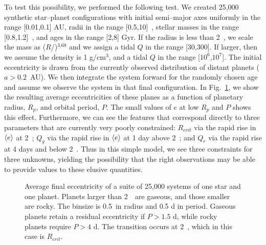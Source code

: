 To test this possibility, we performed the following test. We created
25,000 synthetic star--planet configurations with initial semi--major
axes uniformly in the range [0.01,0.1] AU, radii in the range
[0.5,10]~\rearth, stellar masses in the range [0.8,1.2]~\msun, and
ages in the range [2,8] Gyr.  If the radius is less than 2~\rearth, we
scale the mass as ($R$/\rearth)$^{3.68}$\mearth \citep{Sotin07} and we
assign a tidal $Q$ in the range [30,300].  If larger, then we assume
the density is 1 g/cm$^3$, and a tidal $Q$ in the range
[$10^6$,$10^7$].  The initial eccentricity is drawn from the currently
observed distribution of distant planets ($a > 0.2$~AU).  We then
integrate the system forward for the randomly chosen age and assume we
observe the system in that final configuration. In Fig.~\ref{fig:radper},
we show the resulting average eccentricities of these planes as a
function of planetary radius, $R_p$, and orbital period, $P$.  The
small values of $e$ at low $R_p$ and $P$ shows this effect.
Furthermore, we can see the features that correspond directly to three
parameters that are currently very poorly constrained: $R_{crit}$ via
the rapid rise in $\left< e \right>$ at 2~\rearth; $Q_g$ via the rapid rise in
$\left< e \right>$ at 1 day above 2~\rearth; and $Q_r$ via the rapid rise at 4
days and below 2~\rearth.  Thus in this simple model, we see three
constraints for three unknowns, yielding the possibility that the
right observations may be able to provide values to these elusive
quantities.

\begin{figure}[h]
\centering
\begin{minipage}{2.7in}
\end{minipage}
\begin{minipage}{2.7in}
\caption{\label{fig:radper}Average final eccentricity of a suite of 25,000
systems of one star and one planet. Planets larger than 2~\rearth~are gaseous, and 
those smaller are rocky. The binsize is 0.5~\rearth in radius and 0.5 d in period.
Gaseous planets retain a residual eccentricity if $P > 1.5$ d, while rocky planets require
$P > 4$ d. The transition occurs at 2~\rearth, which in this case is $R_{crit}$. }
\end{minipage}
\end{figure}


